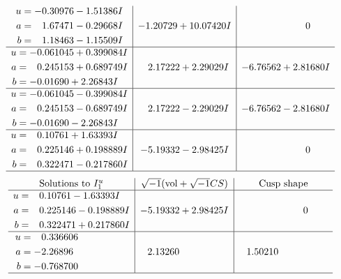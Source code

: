 \documentclass[1p]{elsarticle_modified}
\theoremstyle{definition}
\newcommand{\I}{\sqrt{-1}}
\begin{document}
$$\begin{array}{c|c|c}
\begin{aligned}
u &= -0.30976 - 1.51386 I \\
a &= \phantom{-}1.67471 - 0.29668 I \\
b &= \phantom{-}1.18463 - 1.15509 I\end{aligned}
 & -1.20729 + 10.07420 I & \phantom{-0.000000 } 0 \\ \hline\begin{aligned}
u &= -0.061045 + 0.399084 I \\
a &= \phantom{-}0.245153 + 0.689749 I \\
b &= -0.01690 + 2.26843 I\end{aligned}
 & \phantom{-}2.17222 + 2.29029 I & -6.76562 + 2.81680 I \\ \hline\begin{aligned}
u &= -0.061045 - 0.399084 I \\
a &= \phantom{-}0.245153 - 0.689749 I \\
b &= -0.01690 - 2.26843 I\end{aligned}
 & \phantom{-}2.17222 - 2.29029 I & -6.76562 - 2.81680 I \\ \hline\begin{aligned}
u &= \phantom{-}0.10761 + 1.63393 I \\
a &= \phantom{-}0.225146 + 0.198889 I \\
b &= \phantom{-}0.322471 - 0.217860 I\end{aligned}
 & -5.19332 - 2.98425 I & \phantom{-0.000000 } 0\\
 \hline 
 \end{array}$$\newpage$$\begin{array}{c|c|c}  
\text{Solutions to }I^u_{1}& \I (\text{vol} + \sqrt{-1}CS) & \text{Cusp shape}\\
 \hline 
\begin{aligned}
u &= \phantom{-}0.10761 - 1.63393 I \\
a &= \phantom{-}0.225146 - 0.198889 I \\
b &= \phantom{-}0.322471 + 0.217860 I\end{aligned}
 & -5.19332 + 2.98425 I & \phantom{-0.000000 } 0 \\ \hline\begin{aligned}
u &= \phantom{-}0.336606\phantom{ +0.000000I} \\
a &= -2.26896\phantom{ +0.000000I} \\
b &= -0.768700\phantom{ +0.000000I}\end{aligned}
 & \phantom{-}2.13260\phantom{ +0.000000I} & \phantom{-}1.50210\phantom{ +0.000000I}\\
 \hline 
 \end{array}$$\newpage\newpage\renewcommand{\arraystretch}{1}
\end{document}
